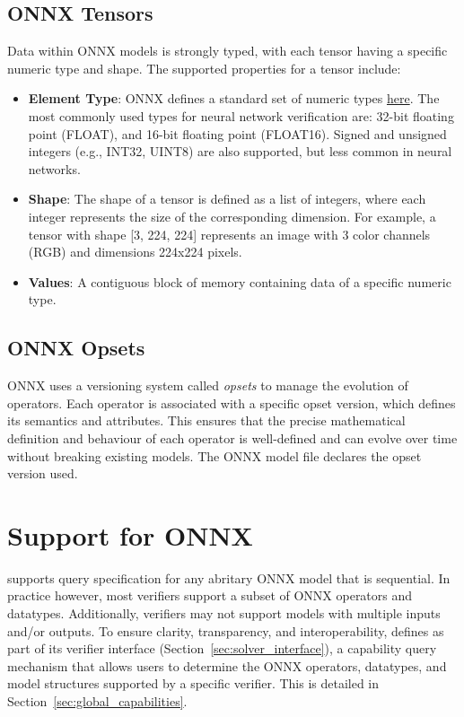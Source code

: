 \subsection{ONNX Tensors}
Data within ONNX models is strongly typed, with each tensor having a specific numeric type and shape. The supported properties for a tensor include:
\begin{itemize}
	\item \textbf{Element Type}: ONNX defines a standard set of numeric types \href{https://onnx.ai/onnx/intro/concepts.html#element-type}{here}. 
	The most commonly used types for neural network verification are: 32-bit floating point (FLOAT), and 16-bit floating point (FLOAT16). Signed and unsigned integers (e.g., INT32, UINT8) are also supported, 
	but less common in neural networks.
	\item \textbf{Shape}: The shape of a tensor is defined as a list of integers, where each integer represents the size of the corresponding dimension. For example, a tensor with shape [3, 224, 224] 
	represents an image with 3 color channels (RGB) and dimensions 224x224 pixels.
	\item \textbf{Values}: A contiguous block of memory containing data of a specific numeric type.
\end{itemize}

\subsection{ONNX Opsets}
ONNX uses a versioning system called \emph{opsets} to manage the evolution of operators. Each operator is associated with a specific opset version, which defines its semantics and attributes.
This ensures that the precise mathematical definition and behaviour of each operator is well-defined and can evolve over time without breaking existing models. The ONNX model file declares the opset
version used.
	
\section{\vnnlib{} Support for ONNX}
\label{sec:onnx_support}
\vnnlib{} supports query specification for any abritary ONNX model that is sequential. In practice however, most verifiers support a subset of ONNX operators and datatypes. Additionally, verifiers may not support
models with multiple inputs and/or outputs. To ensure clarity, transparency, and interoperability, \vnnlib{} defines as part of its verifier interface (Section~\ref{sec:solver_interface}), a capability query 
mechanism that allows users to determine the ONNX operators, datatypes, and model structures supported by a specific verifier. This is detailed in Section~\ref{sec:global_capabilities}.

